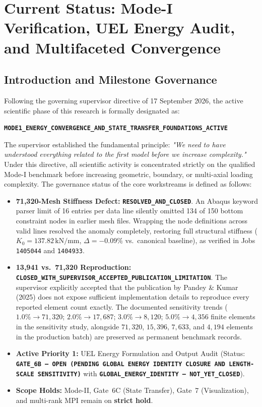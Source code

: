 ﻿\chapter{Current Status: Mode-I Verification, UEL Energy Audit, and Multifaceted Convergence}
\label{cha:current_status}
\label{ch:current_status}

\section{Introduction and Milestone Governance}
\label{sec:gate6b_governance}

Following the governing supervisor directive of 17 September 2026, the active scientific phase of this research is formally designated as:
\begin{center}
  \textbf{\texttt{MODE1\_ENERGY\_CONVERGENCE\_AND\_STATE\_TRANSFER\_FOUNDATIONS\_ACTIVE}}
\end{center}
The supervisor established the fundamental principle: \textit{"We need to have understood everything related to the first model before we increase complexity."} Under this directive, all scientific activity is concentrated strictly on the qualified Mode-I benchmark before increasing geometric, boundary, or multi-axial loading complexity. The governance status of the core workstreams is defined as follows:
\begin{itemize}
  \item \textbf{71,320-Mesh Stiffness Defect:} \textbf{\texttt{RESOLVED\_AND\_CLOSED}}. An Abaqus keyword parser limit of 16 entries per data line silently omitted 134 of 150 bottom constraint nodes in earlier mesh files. Wrapping the node definitions across valid lines resolved the anomaly completely, restoring full structural stiffness ($K_0 = 137.82\,\mathrm{kN/mm}$, $\Delta = -0.09\%$ vs.\ canonical baseline), as verified in Jobs \texttt{1405044} and \texttt{1404933}.
  \item \textbf{13,941 vs.\ 71,320 Reproduction:} \textbf{\texttt{CLOSED\_WITH\_SUPERVISOR\_ACCEPTED\_PUBLICATION\_LIMITATION}}. The supervisor explicitly accepted that the publication by Pandey \& Kumar (2025) does not expose sufficient implementation details to reproduce every reported element count exactly. The documented sensitivity trends ($1.0\% \to 71{,}320$; $2.0\% \to 17{,}687$; $3.0\% \to 8{,}120$; $5.0\% \to 4{,}356$ finite elements in the sensitivity study, alongside $71{,}320$, $15{,}396$, $7{,}633$, and $4{,}194$ elements in the production batch) are preserved as permanent benchmark records.
  \item \textbf{Active Priority 1:} UEL Energy Formulation and Output Audit (Status: \textbf{\texttt{GATE\_6B --- OPEN (PENDING GLOBAL ENERGY IDENTITY CLOSURE AND LENGTH-SCALE SENSITIVITY)}} with \textbf{\texttt{GLOBAL\_ENERGY\_IDENTITY --- NOT\_YET\_CLOSED}}).
  \item \textbf{Scope Holds:} Mode-II, Gate~6C (State Transfer), Gate~7 (Visualization), and multi-rank MPI remain on \textbf{strict hold}.
\end{itemize}

